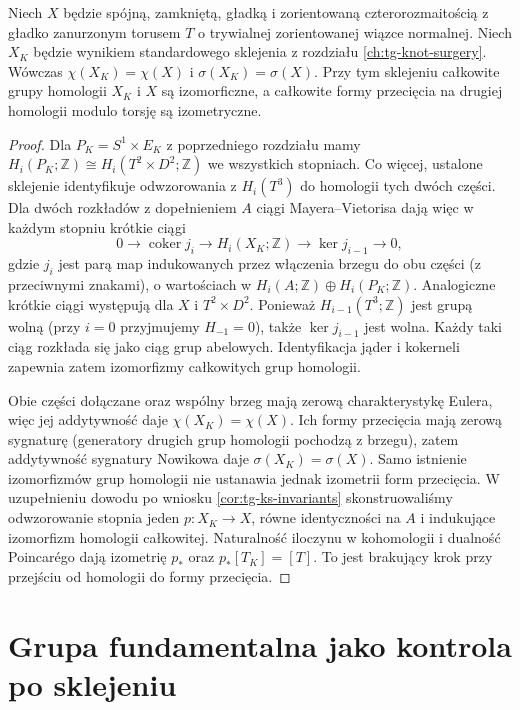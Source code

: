 \begin{stwierdzenie}
\label{prop:tg-syn-knot}
Niech $X$ będzie spójną, zamkniętą, gładką i zorientowaną
czterorozmaitością z gładko zanurzonym torusem $T$
o trywialnej zorientowanej wiązce normalnej.
Niech $X_K$ będzie wynikiem standardowego sklejenia
z rozdziału \ref{ch:tg-knot-surgery}. Wówczas
$\chi(X_K)=\chi(X)$ i $\sigma(X_K)=\sigma(X)$.
Przy tym sklejeniu całkowite grupy homologii $X_K$ i $X$
są izomorficzne, a całkowite formy przecięcia
na drugiej homologii modulo torsję są izometryczne.
\end{stwierdzenie}

\begin{proof}
Dla $P_K=S^1\times E_K$ z poprzedniego rozdziału mamy
$H_i(P_K;\mathbb Z)\cong H_i(T^2\times D^2;\mathbb Z)$
we wszystkich stopniach. Co więcej, ustalone sklejenie
identyfikuje odwzorowania z $H_i(T^3)$ do homologii tych dwóch
części. Dla dwóch rozkładów z dopełnieniem $A$ ciągi
Mayera--Vietorisa dają więc w każdym stopniu krótkie ciągi
\[
 0\longrightarrow\operatorname{coker} j_i
 \longrightarrow H_i(X_K;\mathbb Z)
 \longrightarrow\ker j_{i-1}\longrightarrow0,
\]
gdzie $j_i$ jest parą map indukowanych przez
włączenia brzegu do obu części (z przeciwnymi
znakami), o wartościach w
$H_i(A;\mathbb Z)\oplus H_i(P_K;\mathbb Z)$.
Analogiczne krótkie ciągi występują dla $X$ i $T^2\times D^2$.
Ponieważ $H_{i-1}(T^3;\mathbb Z)$ jest grupą wolną
(przy $i=0$ przyjmujemy $H_{-1}=0$), także
$\ker j_{i-1}$ jest wolna. Każdy taki ciąg rozkłada się
jako ciąg grup abelowych. Identyfikacja jąder i kokerneli
zapewnia zatem izomorfizmy całkowitych grup homologii.

Obie części dołączane oraz wspólny brzeg mają
zerową charakterystykę Eulera, więc jej addytywność
daje $\chi(X_K)=\chi(X)$. Ich formy przecięcia
mają zerową sygnaturę (generatory drugich grup
homologii pochodzą z brzegu), zatem addytywność
sygnatury Nowikowa daje $\sigma(X_K)=\sigma(X)$.
Samo istnienie izomorfizmów grup homologii
nie ustanawia jednak izometrii form przecięcia.
W uzupełnieniu dowodu po wniosku
\ref{cor:tg-ks-invariants} skonstruowaliśmy
odwzorowanie stopnia jeden $p:X_K\to X$,
równe identyczności na $A$ i indukujące
izomorfizm homologii całkowitej.
Naturalność iloczynu w kohomologii i dualność
Poincarégo dają izometrię $p_*$ oraz
$p_*[T_K]=[T]$. To jest brakujący krok
przy przejściu od homologii do formy przecięcia.
\end{proof}

\section{Grupa fundamentalna jako kontrola po sklejeniu}
\label{sec:tg-syn-pi1}

